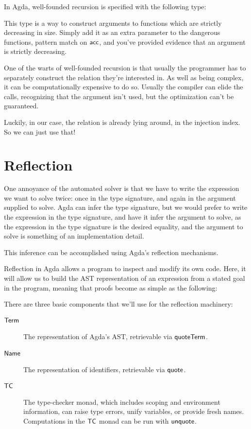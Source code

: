 \documentclass[draft, twocolumn]{article}
\theoremstyle{definition}
\theoremstyle{definition}
\begin{document}
In Agda,  well-founded recursion is specified with the following type:

This type is a way to construct arguments to functions which are strictly
decreasing in size. Simply add it as an extra parameter to the dangerous
functions, pattern match on \(\AgdaInductiveConstructor{acc}\), and you've
provided evidence that an argument is strictly decreasing.

One of the warts of well-founded recursion is that usually the programmer has to
separately construct the relation they're interested in. As well as being
complex, it can be computationally expensive to do so. Usually the compiler can
elide the calls, recognizing that the argument isn't used, but the optimization
can't be guaranteed.

Luckily, in our case, the relation is already lying around, in the injection
index. So we can just use that!

\section{Reflection} \label{reflection}
One annoyance of the automated solver is that we have to write the expression we
want to solve twice: once in the type signature, and again in the argument
supplied to solve. Agda can infer the type signature, but we would prefer to
write the expression in the type signature, and have it infer the argument to
solve, as the expression in the type signature is the desired equality, and the
argument to solve is something of an implementation detail.

This inference can be accomplished using Agda's reflection
mechanisms\cite{van_der_walt_reflection_2012}.

Reflection in Agda allows a program to inspect and modify its own code. Here, it
will allow us to build the AST representation of an expression from a stated
goal in the program, meaning that proofs become as simple as the following:

There are three basic components that we'll use for the reflection machinery:
\begin{description}
  \item[\(\AgdaDatatype{Term}\)] The representation of Agda's AST, retrievable
    via \(\AgdaKeyword{quoteTerm}\).
  \item[\(\AgdaDatatype{Name}\)] The representation of identifiers, retrievable
    via \(\AgdaKeyword{quote}\).
  \item[\(\AgdaDatatype{TC}\)] The type-checker monad, which includes scoping
    and environment information, can raise type errors, unify variables, or
    provide fresh names. Computations in the \(\AgdaDatatype{TC}\) monad can be
    run with \(\AgdaKeyword{unquote}\).
\end{description}
\end{document}
